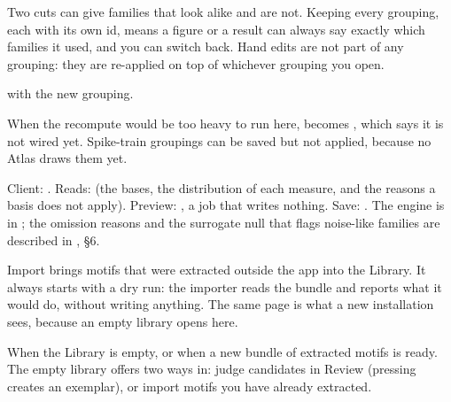 \begin{plainterms}
Two cuts can give families that look alike and are not. Keeping every grouping, each with its
own id, means a figure or a result can always say exactly which families it used, and you
can switch back. Hand edits are not part of any grouping: they are re-applied on top of
whichever grouping you open.
\end{plainterms}

 with the new grouping.

\begin{watchout}
When the recompute would be too heavy to run here,  becomes , which says it is not wired yet. Spike-train groupings can be saved but not
applied, because no Atlas draws them yet.
\end{watchout}

\begin{underthehood}
Client: . Reads:  (the bases, the distribution of each measure, and the reasons a
basis does not apply). Preview: , a  job
that writes nothing. Save: . The engine is
 in ; the omission reasons and the
surrogate null that flags noise-like families are described in
, §6.
\end{underthehood}

Import brings motifs that were extracted outside the app into the Library. It always starts
with a dry run: the importer reads the bundle and reports what it would do, without writing
anything. The same page is what a new installation sees, because an empty library opens here.

When the Library is empty, or when a new bundle of extracted motifs is ready. The empty
library offers two ways in: judge candidates in Review (pressing  creates an
exemplar), or import motifs you have already extracted.


